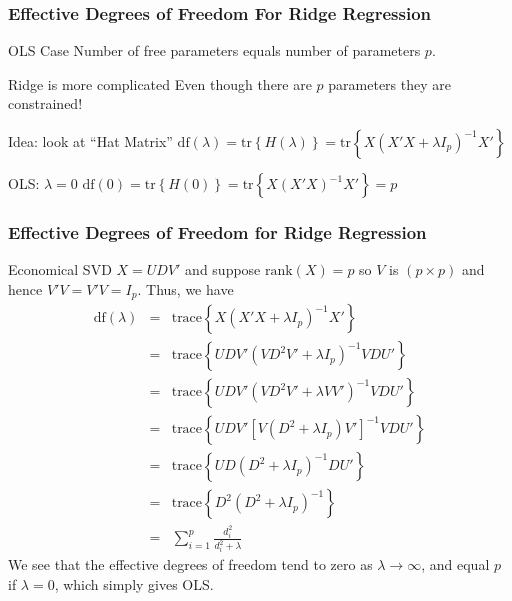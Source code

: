 \begin{frame}
  \frametitle{Effective Degrees of Freedom For Ridge Regression}

  \begin{block}{OLS Case}
   Number of free parameters equals number of parameters $p$. 
  \end{block}

  \begin{block}{Ridge is more complicated}
    Even though there are $p$ parameters they are \alert{constrained}! 
  \end{block}

  \begin{block}{Idea: look at ``Hat Matrix''}
    $\mbox{df}(\lambda) = \mbox{tr}\left\{ H(\lambda) \right\} = \mbox{tr}\left\{ X(X'X + \lambda I_p)^{-1}X' \right\}$
  \end{block}

  \begin{block}{OLS: $\lambda = 0$}
    $\mbox{df}(0) = \mbox{tr}\left\{ H(0) \right\} = \mbox{tr}\left\{ X(X'X)^{-1}X' \right\} = p$
  \end{block}

\end{frame}
\begin{frame}
  \frametitle{Effective Degrees of Freedom for Ridge Regression}
  
  Economical SVD $X = UDV'$ and suppose $\mbox{rank}(X) = p$ so $V$ is $(p\times p)$ and hence $V'V = V'V = I_p$. 
  Thus, we have
	\begin{eqnarray*}
		\mbox{df}(\lambda) &=&  \mbox{trace}\left\{ X(X'X + \lambda I_p)^{-1} X'\right\}\\
		&=& \mbox{trace}\left\{UDV' (VD^2V' + \lambda I_p)^{-1}VDU' \right\}\\
		&=& \mbox{trace}\left\{UDV' (VD^2V' + \lambda VV')^{-1}VDU' \right\}\\
		&=& \mbox{trace}\left\{UDV' \left[V(D^2 + \lambda I_p)V' \right]^{-1}VDU' \right\}\\
		&=&\mbox{trace}\left\{UD(D^2 + \lambda I_p)^{-1}DU'\right\}\\
		&=& \mbox{trace}\left\{D^2(D^2 + \lambda I_p)^{-1}\right\}\\
		&=& \sum_{i=1}^p \frac{d_i^2}{d_i^2 + \lambda}
	\end{eqnarray*}
We see that the effective degrees of freedom tend to zero as $\lambda \rightarrow \infty$, and equal $p$ if $\lambda = 0$, which simply gives OLS. 
\end{frame}
